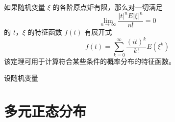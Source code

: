 \documentclass[12pt,a4paper]{amsart}
\begin{document}
\begin{proposition}
    如果随机变量 $\xi$ 的各阶原点矩有限，那么对一切满足
    \begin{equation}
        \lim\limits_{n\to\infty} \frac{|t|^nE|\xi|^n}{n!} = 0
    \end{equation}
    的 $t$，$\xi$ 的特征函数 $f(t)$ 有展开式
    \begin{equation}
        f(t) = \sum_{k=0}^{\infty} \frac{(it)^k}{k!} E(\xi^k)
    \end{equation}
    该定理可用于计算符合某些条件的概率分布的特征函数。
\end{proposition}

\begin{proposition}
    设随机变量 
\end{proposition}

\section{多元正态分布}

\appendix


{\footnotesize}
\end{document}
